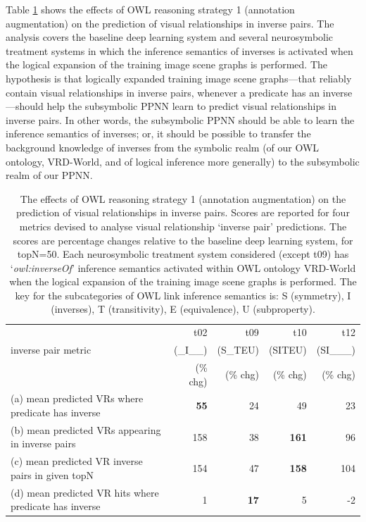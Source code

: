 \documentclass[]{jair}
\begin{document}
Table \ref{table:inverse-pairs-in-pred-vrs} shows the effects of OWL reasoning strategy 1 (annotation augmentation) on the prediction of visual relationships in inverse pairs.
The analysis covers the baseline deep learning system and several neurosymbolic treatment systems in which the inference semantics of inverses is activated  
when the logical expansion of the training image scene graphs is performed. 
The hypothesis is that logically expanded training image scene graphs---that reliably contain visual relationships in inverse pairs, whenever a predicate has an inverse---should help the subsymbolic PPNN learn to predict visual relationships in inverse pairs.
In other words, the subsymbolic PPNN should be able to learn the inference semantics of inverses; or, it should be possible to transfer the background knowledge of inverses from the symbolic realm (of our OWL ontology, VRD-World, and of logical inference more generally) to the subsymbolic realm of our PPNN.

\begin{table}[t]
  \centering
  \footnotesize
  \begin{threeparttable}
  \caption{\footnotesize The effects of OWL reasoning strategy 1 (annotation augmentation) on the prediction of visual relationships in inverse pairs. Scores are reported for four metrics devised to analyse visual relationship `inverse pair' predictions. The scores are percentage changes relative to the baseline deep learning system, for topN=50. Each neurosymbolic treatment system considered (except t09) has `\emph{owl:inverseOf}' inference semantics activated within OWL ontology VRD-World when the logical expansion of the training image scene graphs is performed. The key for the subcategories of OWL link inference semantics is: S (symmetry), I (inverses),  T (transitivity),  E (equivalence),  U (subproperty).}
  \label{table:inverse-pairs-in-pred-vrs}
  \begin{tabular}{lrrrr}
    \toprule 
            & t02 & t09 & t10 & t12 \\
    inverse pair metric  & (\_I\_\_) & (S\_TEU) & (SITEU) & (SI\_\_\_) \\
                 & (\% chg) & (\% chg) & (\% chg) & (\% chg) \\
    \midrule
    (a) mean predicted VRs where predicate has inverse & \textbf{55} & 24 & 49 & 23 \\
    (b) mean predicted VRs appearing in inverse pairs & 158 & 38 & \textbf{161} & 96 \\
    (c) mean predicted VR inverse pairs in given topN & 154 & 47 & \textbf{158} & 104 \\
    (d) mean predicted VR hits where predicate has inverse & 1 & \textbf{17} & 5 & -2 \\
    \bottomrule 
  \end{tabular}
  \end{threeparttable}
\end{table}
\end{document}
